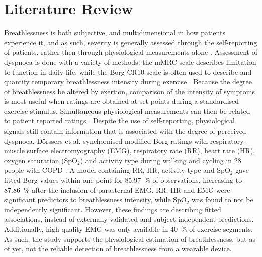 \section{Literature Review}


Breathlessness is both subjective, and multidimensional in how patients experience it, and as such, severity is generally assessed through the self-reporting of patients, rather then through physiological measurements alone \cite{lewthwaiteHowAssessBreathlessness2021, odonnellExertionalDyspnoeaCOPD2016}. Assessment of dyspnoea is done with a variety of methods: the mMRC scale describes limitation to function in daily life, while the Borg CR10 scale is often used to describe and quantify temporary breathlessness intensity during exercise \cite{lewthwaiteHowAssessBreathlessness2021}. Because the degree of breathlessness be altered by exertion, comparison of the intensity of symptoms is most useful when ratings are obtained at set points during a standardised exercise stimulus. Simultaneous physiological measurements can then be related to patient reported ratings \cite{lewthwaiteHowAssessBreathlessness2021, odonnellExertionalDyspnoeaCOPD2016}. Despite the use of self-reporting, physiological signals still contain information that is associated with the degree of perceived dyspnoea. Dörssers et al. synchornised modified-Borg ratings with respiratory-muscle surface electromyography (EMG), respiratory rate (RR), heart rate (HR), oxygen saturation (SpO\(_2\)) and activity type during walking and cycling in 28 people with COPD \cite{dorssersDyspneaRespiratoryEMG2026}. A model containing RR, HR, activity type and SpO\(_2\) gave fitted Borg values within one point for \qty{85.97}{\percent} of observations, increasing to \qty{87.86}{\percent} after the inclusion of parasternal EMG. RR, HR and EMG were significant predictors to breathlessness intensity, while SpO\(_2\) was found to not be independently significant. However, these findings are describing fitted associations, instead of externally validated and subject independent predictions. Additionally, high quality EMG was only available in \qty{40}{\percent} of exercise segments. As such, the study supports the physiological estimation of breathlessness, but as of yet, not the reliable detection of breathlessness from a wearable device.

